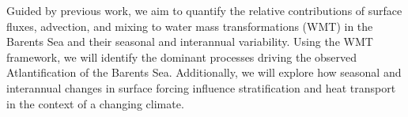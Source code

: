 \documentclass[draft]{agujournal2019}
\begin{document}
Guided by previous work, we aim to quantify the relative contributions of surface fluxes, advection, and mixing to water mass transformations (WMT) in the Barents Sea and their seasonal and interannual variability. Using the WMT framework, we will identify the dominant processes driving the observed Atlantification of the Barents Sea. Additionally, we will explore how seasonal and interannual changes in surface forcing influence stratification and heat transport in the context of a changing climate.







\end{document}
